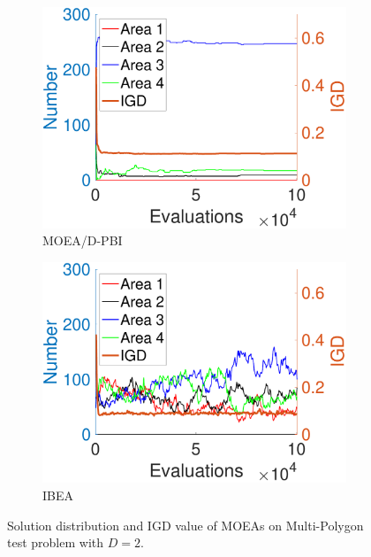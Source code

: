 \documentclass[conference]{IEEEtran}
\begin{document}
\begin{figure}[htbp]
    \begin{subfigure}[b]{.24\textwidth}
    \includegraphics[width=\linewidth]{Section5/dim2/Diversity/MOEAD_PBI}
    \caption{MOEA/D-PBI}
    \label{fig: MOEA/D-PBI Diversity dim=2}
    \end{subfigure}
    \begin{subfigure}[b]{.24\textwidth}
    \includegraphics[width=\linewidth]{Section5/dim2/Diversity/IBEA}
    \caption{IBEA}
    \end{subfigure}

    \caption{Solution distribution and IGD value of MOEAs on Multi-Polygon test problem with $D=2$.}
    \label{fig: MOEAs Diversity dim=2}
\end{figure}
\end{document}
